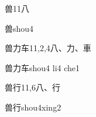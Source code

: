 \begin{Entry}{兽}{11}{⼋}
  \begin{Phonetics}{兽}{shou4}
  \end{Phonetics}
\end{Entry}

\begin{Entry}{兽力车}{11,2,4}{⼋、⼒、⾞}
  \begin{Phonetics}{兽力车}{shou4 li4 che1}
  \end{Phonetics}
\end{Entry}

\begin{Entry}{兽行}{11,6}{⼋、⾏}
  \begin{Phonetics}{兽行}{shou4xing2}
  \end{Phonetics}
\end{Entry}


